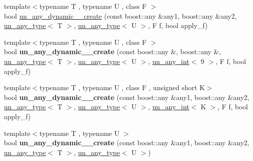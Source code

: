 \begin{DoxyCompactItemize}
\item 
{\footnotesize template$<$typename T , typename U , class F $>$ }\\bool \mbox{\hyperlink{group__boost__any__stuff_ga3a3356c9acf06be5d03879fed1d4b920}{un\+\_\+any\+\_\+dynamic\+\_\+\_\+create}} (const boost\+::any \&any1, boost\+::any \&any2, \mbox{\hyperlink{struct_s_m_spp__di__unipi__it_1_1un__any__type}{un\+\_\+any\+\_\+type}}$<$ T $>$, \mbox{\hyperlink{struct_s_m_spp__di__unipi__it_1_1un__any__type}{un\+\_\+any\+\_\+type}}$<$ U $>$, F f, bool apply\+\_\+f)
\item 
\mbox{\label{group__boost__any__stuff_ga245fd0d1047b5fb75950c57dafd31959}} 
{\footnotesize template$<$typename T , typename U , class F $>$ }\\bool {\bfseries un\+\_\+any\+\_\+dynamic\+\_\+\_\+create} (const boost\+::any \&, boost\+::any \&, \mbox{\hyperlink{struct_s_m_spp__di__unipi__it_1_1un__any__type}{un\+\_\+any\+\_\+type}}$<$ T $>$, \mbox{\hyperlink{struct_s_m_spp__di__unipi__it_1_1un__any__type}{un\+\_\+any\+\_\+type}}$<$ U $>$, \mbox{\hyperlink{struct_s_m_spp__di__unipi__it_1_1un__any__int}{un\+\_\+any\+\_\+int}}$<$ 9 $>$, F f, bool apply\+\_\+f)
\item 
\mbox{\label{group__boost__any__stuff_ga3c7ff63f2cb53b9a420642159fe2b975}} 
{\footnotesize template$<$typename T , typename U , class F , unsigned short K$>$ }\\bool {\bfseries un\+\_\+any\+\_\+dynamic\+\_\+\_\+create} (const boost\+::any \&any1, boost\+::any \&any2, \mbox{\hyperlink{struct_s_m_spp__di__unipi__it_1_1un__any__type}{un\+\_\+any\+\_\+type}}$<$ T $>$, \mbox{\hyperlink{struct_s_m_spp__di__unipi__it_1_1un__any__type}{un\+\_\+any\+\_\+type}}$<$ U $>$, \mbox{\hyperlink{struct_s_m_spp__di__unipi__it_1_1un__any__int}{un\+\_\+any\+\_\+int}}$<$ K $>$, F f, bool apply\+\_\+f)
\item 
\mbox{\label{group__boost__any__stuff_gade81a7917557d71f43e4596cdc8410cb}} 
{\footnotesize template$<$typename T , typename U $>$ }\\bool {\bfseries un\+\_\+any\+\_\+dynamic\+\_\+\_\+create} (const boost\+::any \&any1, boost\+::any \&any2, \mbox{\hyperlink{struct_s_m_spp__di__unipi__it_1_1un__any__type}{un\+\_\+any\+\_\+type}}$<$ T $>$, \mbox{\hyperlink{struct_s_m_spp__di__unipi__it_1_1un__any__type}{un\+\_\+any\+\_\+type}}$<$ U $>$)

\end{DoxyCompactItemize}
